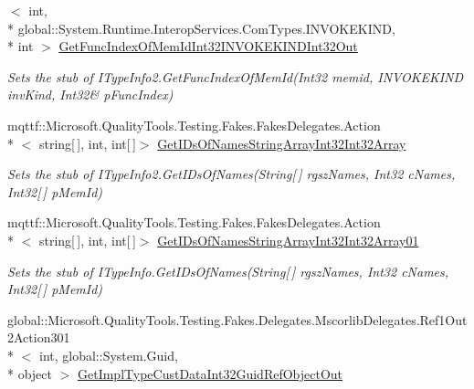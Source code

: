 \begin{DoxyCompactItemize}
$<$ int, \\*
global\-::\-System.\-Runtime.\-Interop\-Services.\-Com\-Types.\-I\-N\-V\-O\-K\-E\-K\-I\-N\-D, \\*
int $>$ \hyperlink{class_system_1_1_runtime_1_1_interop_services_1_1_com_types_1_1_fakes_1_1_stub_i_type_info2_a8427e21581b356c02395fdc2b933c9fc}{Get\-Func\-Index\-Of\-Mem\-Id\-Int32\-I\-N\-V\-O\-K\-E\-K\-I\-N\-D\-Int32\-Out}
\begin{DoxyCompactList}\small\item\em Sets the stub of I\-Type\-Info2.\-Get\-Func\-Index\-Of\-Mem\-Id(Int32 memid, I\-N\-V\-O\-K\-E\-K\-I\-N\-D inv\-Kind, Int32\& p\-Func\-Index)\end{DoxyCompactList}\item 
mqttf\-::\-Microsoft.\-Quality\-Tools.\-Testing.\-Fakes.\-Fakes\-Delegates.\-Action\\*
$<$ string\mbox{[}$\,$\mbox{]}, int, int\mbox{[}$\,$\mbox{]}$>$ \hyperlink{class_system_1_1_runtime_1_1_interop_services_1_1_com_types_1_1_fakes_1_1_stub_i_type_info2_a8de114a66fb0eca68215823784a30c3c}{Get\-I\-Ds\-Of\-Names\-String\-Array\-Int32\-Int32\-Array}
\begin{DoxyCompactList}\small\item\em Sets the stub of I\-Type\-Info2.\-Get\-I\-Ds\-Of\-Names(\-String\mbox{[}$\,$\mbox{]} rgsz\-Names, Int32 c\-Names, Int32\mbox{[}$\,$\mbox{]} p\-Mem\-Id)\end{DoxyCompactList}\item 
mqttf\-::\-Microsoft.\-Quality\-Tools.\-Testing.\-Fakes.\-Fakes\-Delegates.\-Action\\*
$<$ string\mbox{[}$\,$\mbox{]}, int, int\mbox{[}$\,$\mbox{]}$>$ \hyperlink{class_system_1_1_runtime_1_1_interop_services_1_1_com_types_1_1_fakes_1_1_stub_i_type_info2_ab833222348cacc79eccd248092827595}{Get\-I\-Ds\-Of\-Names\-String\-Array\-Int32\-Int32\-Array01}
\begin{DoxyCompactList}\small\item\em Sets the stub of I\-Type\-Info.\-Get\-I\-Ds\-Of\-Names(\-String\mbox{[}$\,$\mbox{]} rgsz\-Names, Int32 c\-Names, Int32\mbox{[}$\,$\mbox{]} p\-Mem\-Id)\end{DoxyCompactList}\item 
global\-::\-Microsoft.\-Quality\-Tools.\-Testing.\-Fakes.\-Delegates.\-Mscorlib\-Delegates.\-Ref1\-Out2\-Action301\\*
$<$ int, global\-::\-System.\-Guid, \\*
object $>$ \hyperlink{class_system_1_1_runtime_1_1_interop_services_1_1_com_types_1_1_fakes_1_1_stub_i_type_info2_abc4bfd7bf5e4bab8af5b17a0a77c00da}{Get\-Impl\-Type\-Cust\-Data\-Int32\-Guid\-Ref\-Object\-Out}

\end{DoxyCompactItemize}
